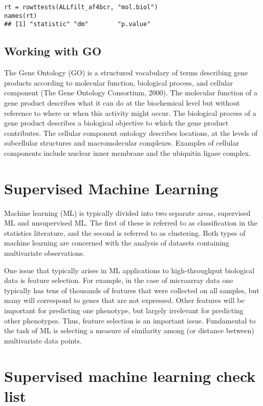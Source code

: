 \begin{verbatim}
rt = rowttests(ALLfilt_af4bcr, "mol.biol")
names(rt)
## [1] "statistic" "dm"        "p.value"
\end{verbatim}

\hypertarget{working-with-go}{%
\subsection{Working with GO}\label{working-with-go}}

The Gene Ontology (GO) is a structured vocabulary of terms describing
gene products according to molecular function, biological process, and
cellular component (The Gene Ontology Consortium, 2000). The molecular
function of a gene product describes what it can do at the biochemical
level but without reference to where or when this activity might occur.
The biological process of a gene product describes a biological
objective to which the gene product contributes. The cellular component
ontology describes locations, at the levels of subcellular structures
and macromolecular complexes. Examples of cellular components include
nuclear inner membrane and the ubiquitin ligase complex.

\hypertarget{supervised-machine-learning}{%
\section{Supervised Machine
Learning}\label{supervised-machine-learning}}

Machine learning (ML) is typically divided into two separate areas,
supervised ML and unsupervised ML. The first of these is referred to as
classification in the statistics literature, and the second is referred
to as clustering. Both types of machine learning are concerned with the
analysis of datasets containing multivariate observations.

One issue that typically arises in ML applications to high-throughput
biological data is feature selection. For example, in the case of
microarray data one typically has tens of thousands of features that
were collected on all samples, but many will correspond to genes that
are not expressed. Other features will be important for predicting one
phenotype, but largely irrelevant for predicting other phenotypes. Thus,
feature selection is an important issue. Fundamental to the task of ML
is selecting a measure of similarity among (or distance between)
multivariate data points.

\hypertarget{supervised-machine-learning-check-list}{%
\section{Supervised machine learning check
list}\label{supervised-machine-learning-check-list}}

